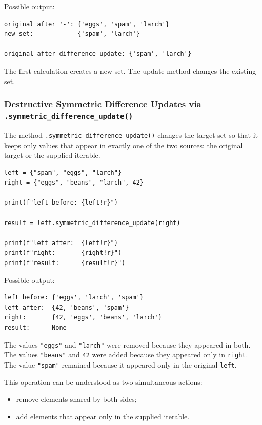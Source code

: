 Possible output:

\begin{verbatim}
original after '-': {'eggs', 'spam', 'larch'}
new_set:            {'spam', 'larch'}

original after difference_update: {'spam', 'larch'}
\end{verbatim}

The first calculation creates a new set. The update method changes the existing set.

\subsubsection{Destructive Symmetric Difference Updates via \texttt{.symmetric\_difference\_update()}}

The method \texttt{.symmetric\_difference\_update()} changes the target set so that it keeps only values that appear in exactly one of the two sources: the original target or the supplied iterable.

\begin{verbatim}
left = {"spam", "eggs", "larch"}
right = {"eggs", "beans", "larch", 42}

print(f"left before: {left!r}")

result = left.symmetric_difference_update(right)

print(f"left after:  {left!r}")
print(f"right:       {right!r}")
print(f"result:      {result!r}")
\end{verbatim}

Possible output:

\begin{verbatim}
left before: {'eggs', 'larch', 'spam'}
left after:  {42, 'beans', 'spam'}
right:       {42, 'eggs', 'beans', 'larch'}
result:      None
\end{verbatim}

The values \texttt{"eggs"} and \texttt{"larch"} were removed because they appeared in both. The values \texttt{"beans"} and \texttt{42} were added because they appeared only in \texttt{right}. The value \texttt{"spam"} remained because it appeared only in the original \texttt{left}.

This operation can be understood as two simultaneous actions:

\begin{itemize}
    \item remove elements shared by both sides;
    \item add elements that appear only in the supplied iterable.
\end{itemize}

